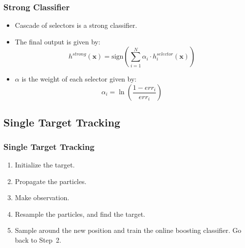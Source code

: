 \documentclass{beamer}
\begin{document}
\begin{frame}
	\frametitle{Strong Classifier}
	\begin{itemize}
		\item Cascade of selectors is a strong classifier.
		\item The final output is given by:
		\begin{equation}
			h^{strong}(\mathbf{x})=\mathrm{sign}(\sum_{i=1}^{N}\alpha_{i}\cdot h^{selector}_{i}(\mathbf{x}))
		\end{equation}
		\item $\alpha$ is the weight of each selector given by:
		\begin{equation}
			\alpha_i=\ln(\frac{1-err_i}{err_i})
		\end{equation}
	\end{itemize}
\end{frame}

\subsection{Single Target Tracking}
\begin{frame}
	\frametitle{Single Target Tracking}
	\begin{enumerate}
		\item Initialize the target.
		\item Propagate the particles.
		\item Make observation.
		\item Resample the particles, and find the target.
		\item Sample around the new position and train the online boosting classifier. Go back to Step~2.
	\end{enumerate}
\end{frame}
\end{document}
